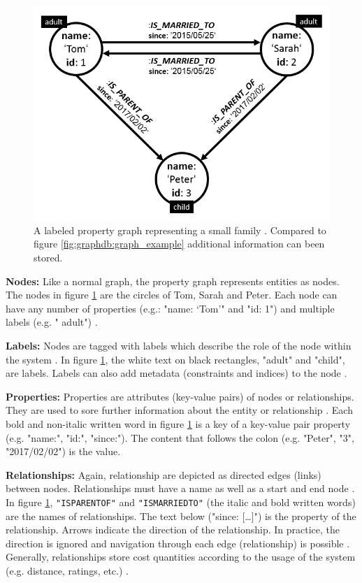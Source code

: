 \begin{figure}[ht]
    \centering
    \includegraphics[width=.5\textwidth]{img/property_graph_example.PNG}
    \caption{A labeled property graph representing a small family \autocite{maheshlal2015, graphdb2015}. Compared to figure \ref{fig:graphdb:graph_example} additional information can been stored.}
    \label{fig:graphdb:property_graph_example}
\end{figure}


\textbf{Nodes:} Like a normal graph, the property graph represents entities as nodes. The nodes in figure \ref{fig:graphdb:property_graph_example} are the circles of Tom, Sarah and Peter. Each node can have any number of properties (e.g.: "name: ‘Tom’" and  "id: 1") and multiple labels (e.g. " adult") \autocite{neo4j:graphdb}.

\textbf{Labels:} Nodes are tagged with labels which describe the role of the node within the system \autocite{maheshlal2015}. In figure \ref{fig:graphdb:property_graph_example}, the white text on black rectangles, "adult" and "child", are labels. Labels can also add metadata (constraints and indices) to the node \autocite{maheshlal2015, neo4j:graphdb}.

\textbf{Properties:} Properties are attributes (key-value pairs) of nodes or relationships. They are used to sore further information about the entity or relationship \autocite{maheshlal2015}. Each bold and non-italic written word in figure \ref{fig:graphdb:property_graph_example} is a key of a key-value pair property (e.g. "name:", "id:", "since:"). The content that follows the colon (e.g. "Peter", "3", "2017/02/02") is the value.

\textbf{Relationships:} Again, relationship are depicted as directed edges (links) between nodes. Relationships must have a name as well as a start and end node \autocite{graphdb2015} . In figure \ref{fig:graphdb:property_graph_example}, \texttt{"IS\textunderscore PARENT\textunderscore OF"} and \texttt{"IS\textunderscore MARRIED\textunderscore TO"} (the italic and bold written words) are the names of relationships. The text below ("since: […]") is the property of the relationship. Arrows indicate the direction of the relationship.  In practice, the direction is ignored and navigation through each edge (relationship) is possible \autocite{maheshlal2015, neo4j:graphdb}. Generally, relationships store cost quantities according to the usage of the system (e.g. distance, ratings, etc.) \autocite{neo4j:graphdb}.

